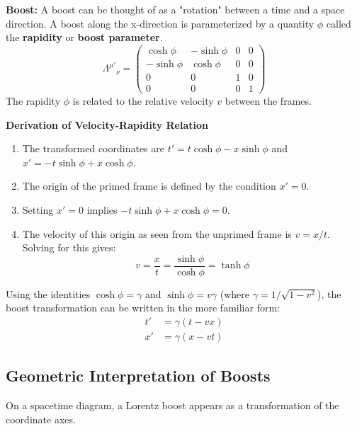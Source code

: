 \documentclass[11pt, a4paper]{report}
\begin{document}
\textbf{Boost:} A boost can be thought of as a "rotation" between a time and a space direction. A boost along the x-direction is parameterized by a quantity $\phi$ called the \textbf{rapidity} or \textbf{boost parameter}.
\begin{equation}\label{eq:boost-matrix}
    {\Lambda^{\mu'}}_{\nu} =
    \begin{pmatrix}
        \cosh\phi & -\sinh\phi & 0 & 0 \\
        -\sinh\phi & \cosh\phi & 0 & 0 \\
        0 & 0 & 1 & 0 \\
        0 & 0 & 0 & 1
    \end{pmatrix}
\end{equation}
The rapidity $\phi$ is related to the relative velocity $v$ between the frames.
\newline

\textbf{Derivation of Velocity-Rapidity Relation}
\begin{enumerate}
    \item The transformed coordinates are $t' = t \cosh\phi - x \sinh\phi$ and $x' = -t \sinh\phi + x \cosh\phi$.
    \item The origin of the primed frame is defined by the condition $x' = 0$.
    \item Setting $x' = 0$ implies $-t \sinh\phi + x \cosh\phi = 0$.
    \item The velocity of this origin as seen from the unprimed frame is $v = x/t$. Solving for this gives:
    \[
        v = \frac{x}{t} = \frac{\sinh\phi}{\cosh\phi} = \tanh\phi
    \]
\end{enumerate}
Using the identities $\cosh\phi = \gamma$ and $\sinh\phi = v\gamma$ (where $\gamma=1/\sqrt{1-v^2}$), the boost transformation can be written in the more familiar form:
\begin{align}
    t' &= \gamma(t - vx) \label{eq:lorentz-tprime} \\
    x' &= \gamma(x - vt) \label{eq:lorentz-xprime}
\end{align}

\subsection*{Geometric Interpretation of Boosts}

On a spacetime diagram, a Lorentz boost appears as a transformation of the coordinate axes.
\end{document}
